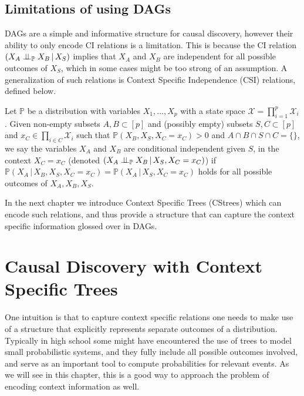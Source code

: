 \documentclass{tufte-book}
\begin{document}
\section{Limitations of using DAGs}
\label{sec:org60070df}
DAGs are a simple and informative structure for causal discovery, however their ability to only encode CI relations is a limitation. This is because the CI relation  \((X_A \perp \!\!\! \perp_{\mathbb{P}} X_B \,|\, X_S)\) implies that \(X_A\) and \(X_B\) are independent for all possible outcomes of \(X_S\), which in some cases might be too strong of an assumption. A generalization of such relations is Context Specific Independence (CSI) relations, defined below.
\begin{definition}\label{def:csirel}
Let  $\mathbb{P}$ be a distribution with variables $X_1,...,X_p$ with a state space $\mathcal{X} = \prod_{i=1}^p \mathcal{X}_i$. Given non-empty subsets $A,B \subset [p]$ and (possibly empty) subsets $S,C \subset [p]$ and $x_C \in \prod_{i \in C}\mathcal{X}_i $ such that $\mathbb{P}(X_B, X_S, X_C = x_C)>0$ and $A \cap B \cap S \cap C = \{\}$, we say the variables $X_A$ and $X_B$ are conditional independent given $S$, in the context $X_C=x_C$ (denoted $(X_A\perp \!\!\! \perp_{\mathbb{P}} X_B \,|\, X_S, X_C=x_C)$) if $\mathbb{P}(X_A \,|\,X_B, X_S,X_C=x_C) = \mathbb{P}(X_A \, |\, X_S,X_C=x_C)$ holds for all possible outcomes of $X_A,X_B,X_S$.
\end{definition}


In the next chapter we introduce Context Specific Trees (CStrees) which can encode such relations, and thus provide a structure that can capture the context specific information glossed over in DAGs.


 \newpage 

\chapter{Causal Discovery with Context Specific Trees}
\label{sec:orge3c992a}
One intuition is that to capture context specific relations one needs to make use of a structure that explicitly represents separate outcomes of a distribution. Typically in high school some might have encountered the use of trees to model small probabilistic systems, and they fully include all possible outcomes involved, and serve as an important tool to compute probabilities for relevant events. As we will see in this chapter, this is a good way to approach the problem of encoding context information as well.
\end{document}
